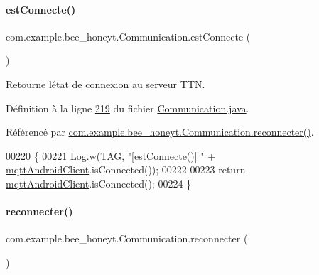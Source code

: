 \paragraph{\texorpdfstring{est\+Connecte()}{estConnecte()}}
{\footnotesize\ttfamily com.\+example.\+bee\+\_\+honeyt.\+Communication.\+est\+Connecte (\begin{DoxyParamCaption}{ }\end{DoxyParamCaption})\hspace{0.3cm}{\ttfamily [static]}}



Retourne l\textquotesingle{}état de connexion au serveur T\+TN. 



Définition à la ligne \hyperlink{_communication_8java_source_l00219}{219} du fichier \hyperlink{_communication_8java_source}{Communication.\+java}.



Référencé par \hyperlink{_communication_8java_source_l00174}{com.\+example.\+bee\+\_\+honeyt.\+Communication.\+reconnecter()}.


\begin{DoxyCode}
00220     \{
00221         Log.w(\hyperlink{classcom_1_1example_1_1bee__honeyt_1_1_communication_a848338dd9654af654c7e681742666785}{TAG}, \textcolor{stringliteral}{"[estConnecte()] "} + \hyperlink{classcom_1_1example_1_1bee__honeyt_1_1_communication_a86db63a356e4638c1d39c54bbe64f0e1}{mqttAndroidClient}.isConnected());
00222 
00223         \textcolor{keywordflow}{return} \hyperlink{classcom_1_1example_1_1bee__honeyt_1_1_communication_a86db63a356e4638c1d39c54bbe64f0e1}{mqttAndroidClient}.isConnected();
00224     \}
\end{DoxyCode}
\mbox{\label{classcom_1_1example_1_1bee__honeyt_1_1_communication_ae0851e23e515c71cfa06cf635c731c07}} 
\paragraph{\texorpdfstring{reconnecter()}{reconnecter()}}
{\footnotesize\ttfamily com.\+example.\+bee\+\_\+honeyt.\+Communication.\+reconnecter (\begin{DoxyParamCaption}{ }\end{DoxyParamCaption})}



